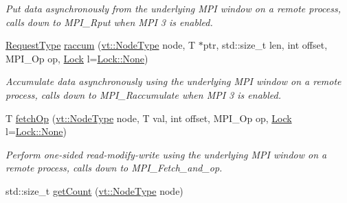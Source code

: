 \begin{DoxyCompactItemize}
\begin{DoxyCompactList}\small\item\em Put data asynchronously from the underlying M\+PI window on a remote process, calls down to {\ttfamily M\+P\+I\+\_\+\+Rput} when M\+PI 3 is enabled. \end{DoxyCompactList}\item 
\hyperlink{structvt_1_1rdma_1_1_handle_3_01_t_00_01_e_00_01_index_t_00_01typename_01std_1_1enable__if__t_3_d15dac1b5db6e2bc0fb0b8aca42b1456_a94cb0db8d9b038fb504cb01b1d1d37a9}{Request\+Type} \hyperlink{structvt_1_1rdma_1_1_handle_3_01_t_00_01_e_00_01_index_t_00_01typename_01std_1_1enable__if__t_3_d15dac1b5db6e2bc0fb0b8aca42b1456_a17bded689684649b563f6379aeaf8b82}{raccum} (\hyperlink{namespacevt_a866da9d0efc19c0a1ce79e9e492f47e2}{vt\+::\+Node\+Type} node, T $\ast$ptr, std\+::size\+\_\+t len, int offset, M\+P\+I\+\_\+\+Op op, \hyperlink{namespacevt_1_1rdma_ac5c20b41a653e520b6305d4d454ecb70}{Lock} l=\hyperlink{namespacevt_1_1rdma_ac5c20b41a653e520b6305d4d454ecb70a6adf97f83acf6453d4a6a4b1070f3754}{Lock\+::\+None})
\begin{DoxyCompactList}\small\item\em Accumulate data asynchronously using the underlying M\+PI window on a remote process, calls down to {\ttfamily M\+P\+I\+\_\+\+Raccumulate} when M\+PI 3 is enabled. \end{DoxyCompactList}\item 
T \hyperlink{structvt_1_1rdma_1_1_handle_3_01_t_00_01_e_00_01_index_t_00_01typename_01std_1_1enable__if__t_3_d15dac1b5db6e2bc0fb0b8aca42b1456_ad5a344cce3e66668c659bb69ee74c5e3}{fetch\+Op} (\hyperlink{namespacevt_a866da9d0efc19c0a1ce79e9e492f47e2}{vt\+::\+Node\+Type} node, T val, int offset, M\+P\+I\+\_\+\+Op op, \hyperlink{namespacevt_1_1rdma_ac5c20b41a653e520b6305d4d454ecb70}{Lock} l=\hyperlink{namespacevt_1_1rdma_ac5c20b41a653e520b6305d4d454ecb70a6adf97f83acf6453d4a6a4b1070f3754}{Lock\+::\+None})
\begin{DoxyCompactList}\small\item\em Perform one-\/sided read-\/modify-\/write using the underlying M\+PI window on a remote process, calls down to {\ttfamily M\+P\+I\+\_\+\+Fetch\+\_\+and\+\_\+op}. \end{DoxyCompactList}\item 
std\+::size\+\_\+t \hyperlink{structvt_1_1rdma_1_1_handle_3_01_t_00_01_e_00_01_index_t_00_01typename_01std_1_1enable__if__t_3_d15dac1b5db6e2bc0fb0b8aca42b1456_af7ca568082262385b17598ae988d5c12}{get\+Count} (\hyperlink{namespacevt_a866da9d0efc19c0a1ce79e9e492f47e2}{vt\+::\+Node\+Type} node)

\end{DoxyCompactItemize}
